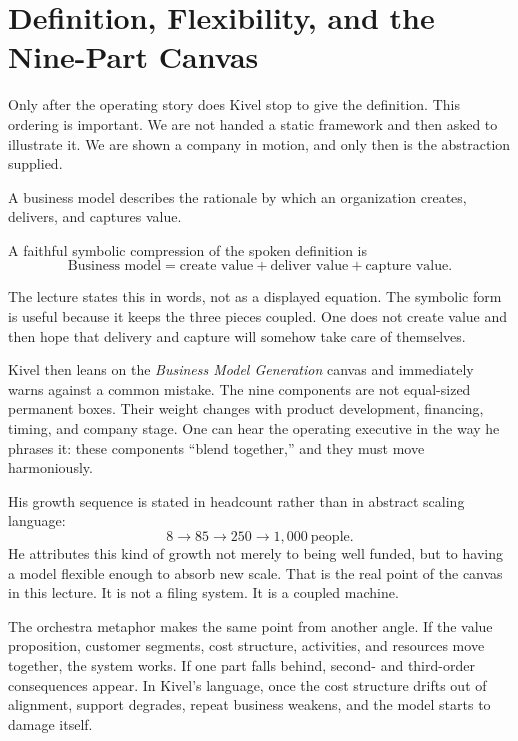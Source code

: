 \section{Definition, Flexibility, and the Nine-Part Canvas}

Only after the operating story does Kivel stop to give the definition. This ordering is important. We are not handed a static framework and then asked to illustrate it. We are shown a company in motion, and only then is the abstraction supplied.

\begin{definition}
A business model describes the rationale by which an organization creates, delivers, and captures value.
\end{definition}

A faithful symbolic compression of the spoken definition is
\begin{equation}
\text{Business model}=\text{create value}+\text{deliver value}+\text{capture value}.
\end{equation}

\begin{remark}
The lecture states this in words, not as a displayed equation. The symbolic form is useful because it keeps the three pieces coupled. One does not create value and then hope that delivery and capture will somehow take care of themselves.
\end{remark}

Kivel then leans on the \emph{Business Model Generation} canvas and immediately warns against a common mistake. The nine components are not equal-sized permanent boxes. Their weight changes with product development, financing, timing, and company stage. One can hear the operating executive in the way he phrases it: these components ``blend together,'' and they must move harmoniously.

His growth sequence is stated in headcount rather than in abstract scaling language:
\begin{equation}
8 \to 85 \to 250 \to 1{,}000 \ \text{people}.
\end{equation}
He attributes this kind of growth not merely to being well funded, but to having a model flexible enough to absorb new scale. That is the real point of the canvas in this lecture. It is not a filing system. It is a coupled machine.

The orchestra metaphor makes the same point from another angle. If the value proposition, customer segments, cost structure, activities, and resources move together, the system works. If one part falls behind, second- and third-order consequences appear. In Kivel's language, once the cost structure drifts out of alignment, support degrades, repeat business weakens, and the model starts to damage itself.

